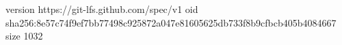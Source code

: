 version https://git-lfs.github.com/spec/v1
oid sha256:8e57c74f9ef7bb77498c925872a047e81605625db733f8b9cfbcb405b4084667
size 1032
